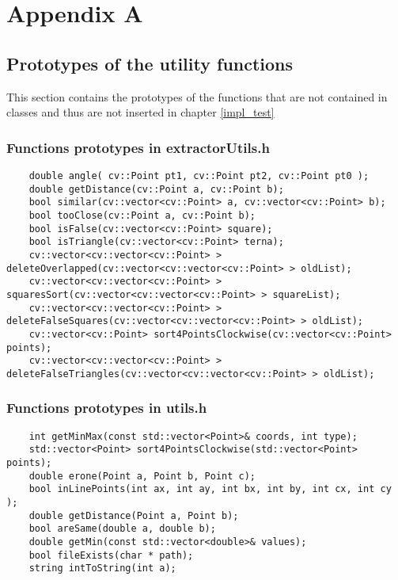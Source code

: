 \appendix
\chapter{Appendix A}\label{appA}

	\section{Prototypes of the utility functions}
	This section contains the prototypes of the functions that are not contained in classes and thus are not inserted in chapter \ref{impl_test}
	
	\subsection*{Functions prototypes in extractorUtils.h}
	\begin{lstlisting}
	double angle( cv::Point pt1, cv::Point pt2, cv::Point pt0 );
	double getDistance(cv::Point a, cv::Point b);
	bool similar(cv::vector<cv::Point> a, cv::vector<cv::Point> b);
	bool tooClose(cv::Point a, cv::Point b);
	bool isFalse(cv::vector<cv::Point> square);
	bool isTriangle(cv::vector<cv::Point> terna);
	cv::vector<cv::vector<cv::Point> > deleteOverlapped(cv::vector<cv::vector<cv::Point> > oldList);
	cv::vector<cv::vector<cv::Point> > squaresSort(cv::vector<cv::vector<cv::Point> > squareList);
	cv::vector<cv::vector<cv::Point> > deleteFalseSquares(cv::vector<cv::vector<cv::Point> > oldList);
	cv::vector<cv::Point> sort4PointsClockwise(cv::vector<cv::Point> points);
	cv::vector<cv::vector<cv::Point> > deleteFalseTriangles(cv::vector<cv::vector<cv::Point> > oldList);
	\end{lstlisting}

	\subsection*{Functions prototypes in utils.h}
	\begin{lstlisting}
	int getMinMax(const std::vector<Point>& coords, int type);
	std::vector<Point> sort4PointsClockwise(std::vector<Point> points);
	double erone(Point a, Point b, Point c);
	bool inLinePoints(int ax, int ay, int bx, int by, int cx, int cy );
	double getDistance(Point a, Point b);
	bool areSame(double a, double b);
	double getMin(const std::vector<double>& values);
	bool fileExists(char * path);
	string intToString(int a);
	\end{lstlisting}
